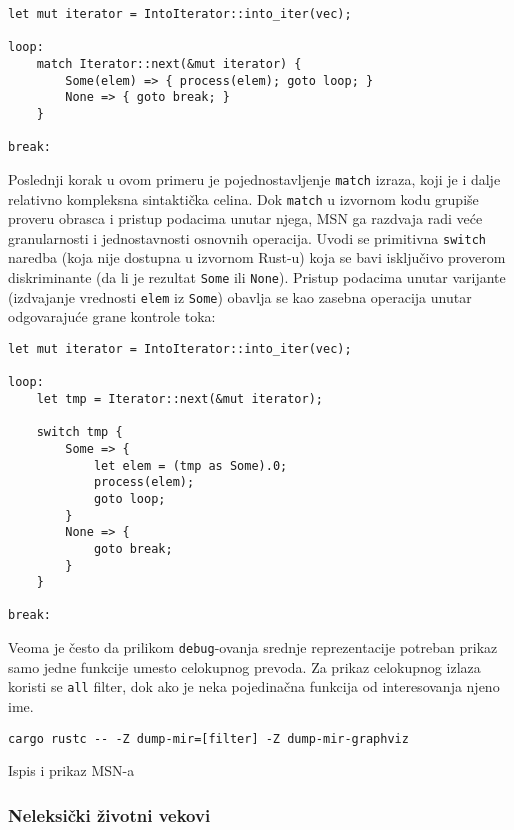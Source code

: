 \begin{verbatim}
let mut iterator = IntoIterator::into_iter(vec);

loop: 
    match Iterator::next(&mut iterator) {
        Some(elem) => { process(elem); goto loop; } 
        None => { goto break; } 
    }

break: 
\end{verbatim}

Poslednji korak u ovom primeru je pojednostavljenje \verb|match| izraza, koji je i dalje relativno kompleksna sintaktička celina. 
Dok \verb|match| u izvornom kodu grupiše proveru obrasca i pristup podacima unutar njega, 
MSN ga razdvaja radi veće granularnosti i jednostavnosti osnovnih operacija. 
Uvodi se primitivna \verb|switch| naredba (koja nije dostupna u izvornom Rust-u) koja se bavi isključivo proverom diskriminante 
(da li je rezultat \verb|Some| ili \verb|None|). Pristup podacima unutar varijante 
(izdvajanje vrednosti \verb|elem| iz \verb|Some|) obavlja se kao zasebna operacija unutar odgovarajuće grane kontrole toka:

\break

\begin{verbatim}
let mut iterator = IntoIterator::into_iter(vec);

loop:
    let tmp = Iterator::next(&mut iterator); 
    
    switch tmp { 
        Some => { 
            let elem = (tmp as Some).0; 
            process(elem); 
            goto loop; 
        }
        None => { 
            goto break; 
        }
    }
    
break:
\end{verbatim}


Veoma je često da prilikom \verb|debug|-ovanja srednje reprezentacije potreban prikaz samo jedne funkcije
umesto celokupnog prevoda. Za prikaz celokupnog izlaza koristi se \verb|all| filter, dok ako je neka pojedinačna funkcija od interesovanja
njeno ime.

\begin{listing}[H]
\begin{verbatim}
cargo rustc -- -Z dump-mir=[filter] -Z dump-mir-graphviz
\end{verbatim}
\caption{Ispis i prikaz MSN-a}
\label{lst:mir_print}
\end{listing}

\subsubsection{Neleksički životni vekovi}

